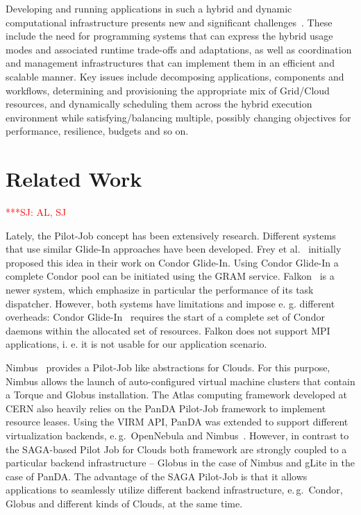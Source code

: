 \documentclass[conference,final]{IEEEtran}
\newcommand{\jhanote}[1]{ {\textcolor{red} { ***SJ: #1 }}}
\newcommand{\jhanote}[1]{}
\begin{document}
Developing and running applications in such a hybrid and dynamic
computational infrastructure presents new and significant
challenges~\cite{cloud-grid-autonomics}. These include the need for
programming systems that can express the hybrid usage modes and
associated runtime trade-offs and adaptations, as well as coordination
and management infrastructures that can implement them in an efficient
and scalable manner. Key issues include decomposing applications,
components and workflows, determining and provisioning the appropriate
mix of Grid/Cloud resources, and dynamically scheduling them across
the hybrid execution environment while satisfying/balancing multiple,
possibly changing objectives for performance, resilience, budgets and
so on.

\section{Related Work} \jhanote{AL, SJ}

Lately, the Pilot-Job concept has been extensively research.
Different systems that use similar Glide-In approaches have been
developed. Frey et al.~\cite{citeulike:291860} initially proposed this idea in their
work on Condor Glide-In. Using Condor Glide-In a complete Condor pool
can be initiated using the GRAM service. Falkon~\cite{1362680} is a
newer system, which emphasize in particular the performance of its
task dispatcher. However, both systems have limitations and impose
e. g. different overheads: Condor Glide-In~\cite{citeulike:291860}
requires the start of a complete set of Condor daemons within the
allocated set of resources. Falkon does not support MPI applications,
i. e. it is not usable for our application scenario.

Nimbus~\cite{10.1109/MIC.2009.94} provides a Pilot-Job like
abstractions for Clouds. For this purpose, Nimbus allows the launch of
auto-configured virtual machine clusters that contain a Torque and
Globus installation.  The Atlas computing framework developed at CERN
also heavily relies on the PanDA Pilot-Job framework to implement
resource leases. Using the VIRM API, PanDA was extended to support
different virtualization backends, e.\,g.\ OpenNebula and
Nimbus~\cite{1555338}. However, in contrast to the SAGA-based Pilot
Job for Clouds both framework are strongly coupled to a particular
backend infrastructure -- Globus in the case of Nimbus and gLite in
the case of PanDA. The advantage of the SAGA Pilot-Job is that it
allows applications to seamlessly utilize different backend
infrastructure, e.\,g.\ Condor, Globus and different kinds of Clouds,
at the same time.
\end{document}
